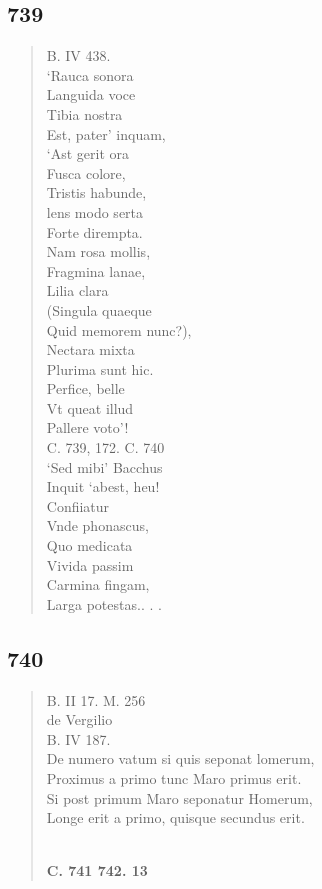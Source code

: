 \documentclass[11pt, a4paper]{report}
\begin{document}
            \subsection*{739}
      \begin{verse}
      B. IV 438. \\ ‘Rauca sonora \\ Languida voce \\ Tibia nostra \\ Est, pater’ inquam, \\ ‘Ast gerit ora \\ Fusca colore, \\ Tristis habunde, \\ lens modo serta \\ Forte dirempta. \\ Nam rosa mollis, \\ Fragmina lanae, \\ Lilia clara \\ (Singula quaeque \\ Quid memorem nunc?), \\ Nectara mixta \\ Plurima sunt hic. \\ Perfice, belle \\ Vt queat illud \\ Pallere voto’! \\ 
        ﻿\pagebreak 
    C. 739, 172. C. 740 \\ ‘Sed mibi’ Bacchus \\ Inquit ‘abest, heu! \\ Confiiatur \\ Vnde phonascus, \\ Quo medicata \\ Vivida passim \\ Carmina fingam, \\ Larga potestas.. . . \\ 
      \end{verse}
  
            \subsection*{740}
      \begin{verse}
      B. II 17. M. 256 \\ de Vergilio \\ B. IV 187. \\ De numero vatum si quis seponat lomerum, \\ Proximus a primo tunc Maro primus erit. \\ Si post primum Maro seponatur Homerum, \\ Longe erit a primo, quisque secundus erit. \\ 
        ﻿\pagebreak 
    \begin{center} \textbf{C. 741 742. 13} \end{center} \marginpar{[225]} 
      \end{verse}
  
\end{document}
